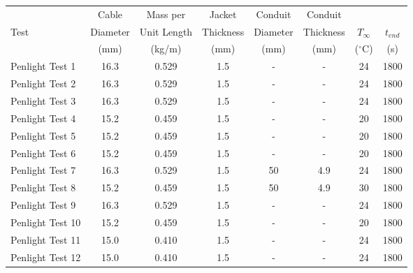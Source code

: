 \begin{table}[!ht]
\begin{center}
\begin{tabular}{|l|c|c|c|c|c|c|c|}
\hline
                  &  Cable     &  Mass per     &  Jacket     &  Conduit   &  Conduit    &               &             \\
Test              &  Diameter  &  Unit Length  &  Thickness  &  Diameter  &  Thickness  &  $T_\infty$   &  $t_{end}$  \\
                  &  (mm)      &  (kg/m)       &  (mm)       &  (mm)      &  (mm)       &  ($^\circ$C)  &  (s)        \\ \hline \hline
Penlight Test 1   &  16.3      &  0.529        &  1.5        &  -         &  -          &  24           &  1800       \\ \hline
Penlight Test 2   &  16.3      &  0.529        &  1.5        &  -         &  -          &  24           &  1800       \\ \hline
Penlight Test 3   &  16.3      &  0.529        &  1.5        &  -         &  -          &  24           &  1800       \\ \hline
Penlight Test 4   &  15.2      &  0.459        &  1.5        &  -         &  -          &  20           &  1800       \\ \hline
Penlight Test 5   &  15.2      &  0.459        &  1.5        &  -         &  -          &  20           &  1800       \\ \hline
Penlight Test 6   &  15.2      &  0.459        &  1.5        &  -         &  -          &  20           &  1800       \\ \hline
Penlight Test 7   &  16.3      &  0.529        &  1.5        &  50        &  4.9        &  24           &  1800       \\ \hline
Penlight Test 8   &  15.2      &  0.459        &  1.5        &  50        &  4.9        &  30           &  1800       \\ \hline
Penlight Test 9   &  16.3      &  0.529        &  1.5        &  -         &  -          &  24           &  1800       \\ \hline
Penlight Test 10  &  15.2      &  0.459        &  1.5        &  -         &  -          &  20           &  1800       \\ \hline
Penlight Test 11  &  15.0      &  0.410        &  1.5        &  -         &  -          &  24           &  1800       \\ \hline
Penlight Test 12  &  15.0      &  0.410        &  1.5        &  -         &  -          &  24           &  1800       \\ \hline

\end{tabular}
\end{center}
\end{table}
